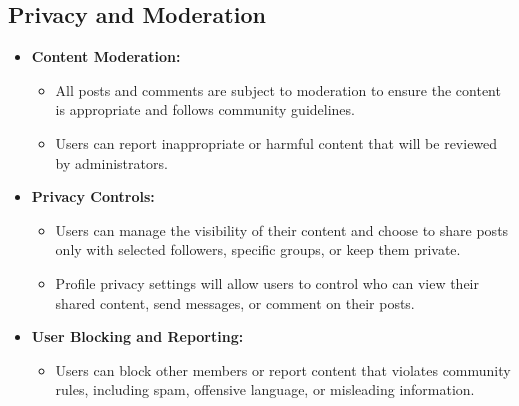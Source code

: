 \subsection{Privacy and Moderation}
\begin{itemize}
    \item \textbf{Content Moderation:}
    \begin{itemize}
        \item All posts and comments are subject to moderation to ensure the content is appropriate and follows community guidelines.
        \item Users can report inappropriate or harmful content that will be reviewed by administrators.
    \end{itemize}
    
    \item \textbf{Privacy Controls:}
    \begin{itemize}
        \item Users can manage the visibility of their content and choose to share posts only with selected followers, specific groups, or keep them private.
        \item Profile privacy settings will allow users to control who can view their shared content, send messages, or comment on their posts.
    \end{itemize}
    
    \item \textbf{User Blocking and Reporting:}
    \begin{itemize}
        \item Users can block other members or report content that violates community rules, including spam, offensive language, or misleading information.
    \end{itemize}
\end{itemize}

